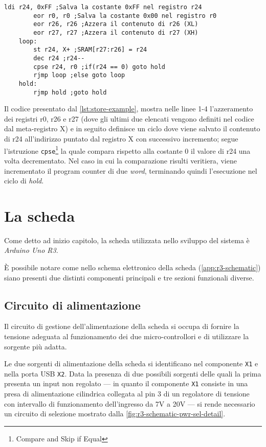 \noindent\begin{minipage}{\textwidth}
    \begin{lstlisting}[language=AVR, caption={Esempio di utilizzo dell'istruzione \texttt{st}}, label=lst:store-example]
        ldi r24, 0xFF ;Salva la costante 0xFF nel registro r24
        eor r0, r0 ;Salva la costante 0x00 nel registro r0
        eor r26, r26 ;Azzera il contenuto di r26 (XL)
        eor r27, r27 ;Azzera il contenuto di r27 (XH)
    loop:
        st r24, X+ ;SRAM[r27:r26] = r24
        dec r24 ;r24--
        cpse r24, r0 ;if(r24 == 0) goto hold
        rjmp loop ;else goto loop
    hold:
        rjmp hold ;goto hold

    \end{lstlisting}
\end{minipage}

Il codice presentato dal \cref{lst:store-example}, mostra nelle linee 1-4 l'azzeramento dei registri r0, r26 e r27 (dove gli ultimi due elencati vengono definiti nel codice dal meta-registro X) e in seguito definisce un ciclo dove viene salvato il contenuto di r24 all'indirizzo puntato dal registro X con successivo incremento; segue l'istruzione \texttt{cpse}\footnote{Compare and Skip if Equal} la quale compara rispetto alla costante 0 il valore di r24 una volta decrementato. Nel caso in cui la comparazione risulti veritiera, viene incrementato il program counter di due \textit{word}, terminando quindi l'esecuzione nel ciclo di \textit{hold}.

\section{La scheda}
Come detto ad inizio capitolo, la scheda utilizzata nello sviluppo del sistema è \textit{Arduino Uno R3}.

È possibile notare come nello schema elettronico della scheda (\ref{app:r3-schematic}) siano presenti due distinti componenti principali e tre sezioni funzionali diverse.

\subsection{Circuito di alimentazione}

Il circuito di gestione dell'alimentazione della scheda si occupa di fornire la tensione adeguata al funzionamento dei due micro-controllori e di utilizzare la sorgente più adatta.

Le due sorgenti di alimentazione della scheda si identificano nel componente \texttt{X1} e nella porta USB \texttt{X2}. Data la presenza di due possibili sorgenti delle quali la prima presenta un input non regolato --- in quanto il componente \texttt{X1} consiste in una presa di alimentazione cilindrica collegata al pin 3 di un regolatore di tensione con intervallo di funzionamento dell'ingresso da 7V a 20V\cite{onsemi:ncp111750} --- si rende necessario un circuito di selezione mostrato dalla \cref{fig:r3-schematic-pwr-sel-detail}.


